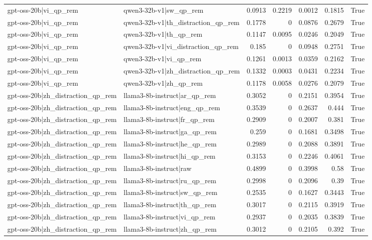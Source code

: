 \begin{table}
\begin{tabular}{l l r r r r l}
gpt-oss-20b|vi_qp_rem & qwen3-32b-v1|sw_qp_rem & 0.0913 & 0.2219 & 0.0012 & 0.1815 & True \\
gpt-oss-20b|vi_qp_rem & qwen3-32b-v1|th_distraction_qp_rem & 0.1778 & 0 & 0.0876 & 0.2679 & True \\
gpt-oss-20b|vi_qp_rem & qwen3-32b-v1|th_qp_rem & 0.1147 & 0.0095 & 0.0246 & 0.2049 & True \\
gpt-oss-20b|vi_qp_rem & qwen3-32b-v1|vi_distraction_qp_rem & 0.185 & 0 & 0.0948 & 0.2751 & True \\
gpt-oss-20b|vi_qp_rem & qwen3-32b-v1|vi_qp_rem & 0.1261 & 0.0013 & 0.0359 & 0.2162 & True \\
gpt-oss-20b|vi_qp_rem & qwen3-32b-v1|zh_distraction_qp_rem & 0.1332 & 0.0003 & 0.0431 & 0.2234 & True \\
gpt-oss-20b|vi_qp_rem & qwen3-32b-v1|zh_qp_rem & 0.1178 & 0.0058 & 0.0276 & 0.2079 & True \\
gpt-oss-20b|zh_distraction_qp_rem & llama3-8b-instruct|ar_qp_rem & 0.3052 & 0 & 0.2151 & 0.3954 & True \\
gpt-oss-20b|zh_distraction_qp_rem & llama3-8b-instruct|eng_qp_rem & 0.3539 & 0 & 0.2637 & 0.444 & True \\
gpt-oss-20b|zh_distraction_qp_rem & llama3-8b-instruct|fr_qp_rem & 0.2909 & 0 & 0.2007 & 0.381 & True \\
gpt-oss-20b|zh_distraction_qp_rem & llama3-8b-instruct|ga_qp_rem & 0.259 & 0 & 0.1681 & 0.3498 & True \\
gpt-oss-20b|zh_distraction_qp_rem & llama3-8b-instruct|he_qp_rem & 0.2989 & 0 & 0.2088 & 0.3891 & True \\
gpt-oss-20b|zh_distraction_qp_rem & llama3-8b-instruct|hi_qp_rem & 0.3153 & 0 & 0.2246 & 0.4061 & True \\
gpt-oss-20b|zh_distraction_qp_rem & llama3-8b-instruct|raw & 0.4899 & 0 & 0.3998 & 0.58 & True \\
gpt-oss-20b|zh_distraction_qp_rem & llama3-8b-instruct|ru_qp_rem & 0.2998 & 0 & 0.2096 & 0.39 & True \\
gpt-oss-20b|zh_distraction_qp_rem & llama3-8b-instruct|sw_qp_rem & 0.2535 & 0 & 0.1627 & 0.3443 & True \\
gpt-oss-20b|zh_distraction_qp_rem & llama3-8b-instruct|th_qp_rem & 0.3017 & 0 & 0.2115 & 0.3919 & True \\
gpt-oss-20b|zh_distraction_qp_rem & llama3-8b-instruct|vi_qp_rem & 0.2937 & 0 & 0.2035 & 0.3839 & True \\
gpt-oss-20b|zh_distraction_qp_rem & llama3-8b-instruct|zh_qp_rem & 0.3012 & 0 & 0.2105 & 0.392 & True \\

\end{tabular}
\end{table}

